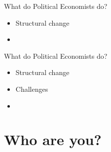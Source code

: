 \documentclass[10pt, show notes]{beamer}
\begin{document}
\begin{frame}{What do Political Economists do?}
\begin{itemize}[<+- | alert@+>]
	\item Structural change
	\item {}
\end{itemize}
\end{frame}
\begin{frame}{What do Political Economists do?}
\begin{itemize}[<+- | alert@+>]
	\item Structural change
	\item Challenges
	\item {}
\end{itemize}
\end{frame}

\section{Who are you?}
\end{document}
